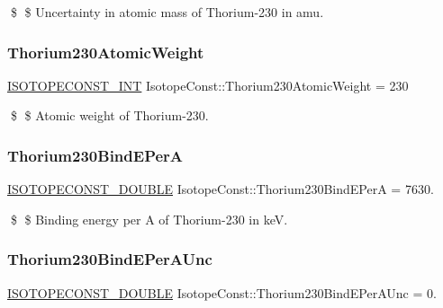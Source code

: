 \$ \$ Uncertainty in atomic mass of Thorium-\/230 in amu. \mbox{\label{group___isotope_const-_thorium-_th230_ga082ae70616e349008cbc434e51bc07d1}} 
\subsubsection{\texorpdfstring{Thorium230\+Atomic\+Weight}{Thorium230AtomicWeight}}
{\footnotesize\ttfamily \mbox{\hyperlink{group___isotope_const-_macros_ga5f18360b3e99483a35c32d789e62621c}{I\+S\+O\+T\+O\+P\+E\+C\+O\+N\+S\+T\+\_\+\+I\+NT}} Isotope\+Const\+::\+Thorium230\+Atomic\+Weight = 230}

\$ \$ Atomic weight of Thorium-\/230. \mbox{\label{group___isotope_const-_thorium-_th230_gaa48d9c6b1474d6f4f76bcbff5f50eeda}} 
\subsubsection{\texorpdfstring{Thorium230\+Bind\+E\+PerA}{Thorium230BindEPerA}}
{\footnotesize\ttfamily \mbox{\hyperlink{group___isotope_const-_macros_ga8f45a7272ce02c0b4c65c44636ed719a}{I\+S\+O\+T\+O\+P\+E\+C\+O\+N\+S\+T\+\_\+\+D\+O\+U\+B\+LE}} Isotope\+Const\+::\+Thorium230\+Bind\+E\+PerA = 7630.}

\$ \$ Binding energy per A of Thorium-\/230 in keV. \mbox{\label{group___isotope_const-_thorium-_th230_gaf7b762b05e90993064278d39c4062285}} 
\subsubsection{\texorpdfstring{Thorium230\+Bind\+E\+Per\+A\+Unc}{Thorium230BindEPerAUnc}}
{\footnotesize\ttfamily \mbox{\hyperlink{group___isotope_const-_macros_ga8f45a7272ce02c0b4c65c44636ed719a}{I\+S\+O\+T\+O\+P\+E\+C\+O\+N\+S\+T\+\_\+\+D\+O\+U\+B\+LE}} Isotope\+Const\+::\+Thorium230\+Bind\+E\+Per\+A\+Unc = 0.}

